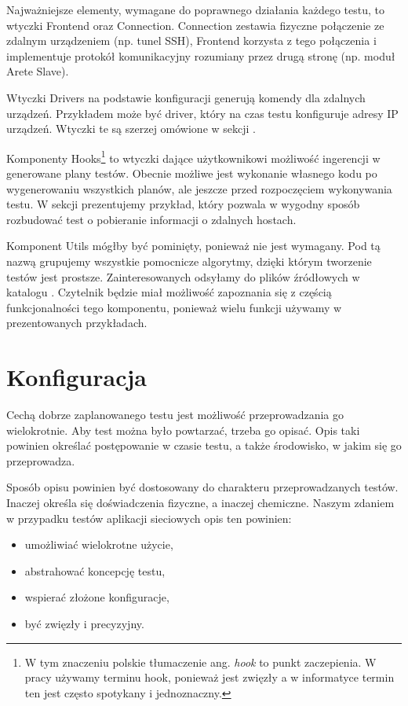 \documentclass[00-praca-magisterska.tex]{subfiles}
\begin{document}
Najważniejsze elementy, wymagane do poprawnego działania każdego testu, to
wtyczki Frontend oraz Connection. Connection zestawia fizyczne połączenie ze
zdalnym urządzeniem (np. tunel SSH), Frontend korzysta z tego połączenia i
implementuje protokół komunikacyjny rozumiany przez drugą stronę (np. moduł
Arete Slave).

Wtyczki Drivers na podstawie konfiguracji generują komendy dla zdalnych
urządzeń. Przykładem może być driver, który na czas testu konfiguruje adresy IP
urządzeń. Wtyczki te są szerzej omówione w sekcji .

Komponenty Hooks\footnote{W tym znaczeniu polskie tłumaczenie ang. \emph{hook}
to punkt zaczepienia. W pracy używamy terminu hook, ponieważ jest zwięzły a w
informatyce termin ten jest często spotykany i jednoznaczny.} to wtyczki dające
użytkownikowi możliwość ingerencji w generowane plany testów. Obecnie możliwe
jest wykonanie własnego kodu po wygenerowaniu wszystkich planów, ale jeszcze
przed rozpoczęciem wykonywania testu. W sekcji 
prezentujemy przykład, który pozwala w wygodny sposób rozbudować test o
pobieranie informacji o zdalnych hostach.

Komponent Utils mógłby być pominięty, ponieważ nie jest wymagany. Pod tą nazwą
grupujemy wszystkie pomocnicze algorytmy, dzięki którym tworzenie testów jest
prostsze. Zainteresowanych odsyłamy do plików źródłowych w katalogu
. Czytelnik będzie miał możliwość zapoznania się z częścią
funkcjonalności tego komponentu, ponieważ wielu funkcji używamy w
prezentowanych przykładach.

\section{Konfiguracja}

Cechą dobrze zaplanowanego testu jest możliwość przeprowadzania go
wielokrotnie. Aby test można było powtarzać, trzeba go opisać. Opis taki
powinien określać postępowanie w czasie testu, a także środowisko, w jakim się
go przeprowadza.

Sposób opisu powinien być dostosowany do charakteru przeprowadzanych testów.
Inaczej określa się doświadczenia fizyczne, a inaczej chemiczne. Naszym
zdaniem w przypadku testów aplikacji sieciowych opis ten powinien:
\begin{itemize}
\item umożliwiać wielokrotne użycie,
\item abstrahować koncepcję testu,
\item wspierać złożone konfiguracje,
\item być zwięzły i precyzyjny.
\end{itemize}
\end{document}
